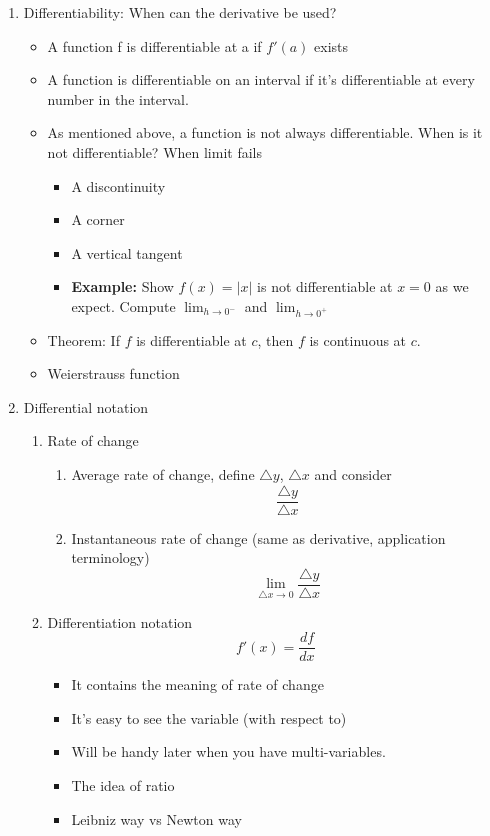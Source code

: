 \documentclass{article}
\begin{document}
\begin{enumerate}
\item Differentiability: When can the derivative be used? 
\begin{itemize}
\item A function f is differentiable at a if $f'(a)$ exists
\item A function is differentiable on an interval if it's differentiable at every number in the interval. 
\item As mentioned above, a function is not always differentiable. When is it not differentiable? When limit fails
\begin{itemize}
\item A discontinuity
\item A corner
\item A vertical tangent
\item {\bf Example: } Show $f(x) =|x|$ is not differentiable at $x=0$ as we expect. Compute $\lim_{h\rightarrow 0^-}$ and $\lim_{h\rightarrow 0^+}$
\end{itemize}
\item Theorem: If $f$ is differentiable at $c$, then $f$ is continuous at $c$. 
\item Weierstrauss function
\end{itemize}
\item Differential notation
\begin{enumerate}
\item Rate of change
\begin{enumerate}
\item Average rate of change, define $\triangle y$, $\triangle x$ and consider
$$\frac{\triangle y}{\triangle x}$$
\item Instantaneous rate of change (same as derivative, application terminology)
$$
\lim_{\triangle x\rightarrow 0}\frac{\triangle y }{\triangle x}
$$
\end{enumerate}
\item Differentiation notation
$$
f'(x) = \frac{df}{dx}
$$
\begin{itemize}
\item It contains the meaning of rate of change
\item It's easy to see the variable (with respect to)
\item Will be handy later when you have multi-variables.
\item The idea of ratio
\item Leibniz way vs Newton way
\end{itemize}

\end{enumerate}
\end{enumerate}
\end{document}
